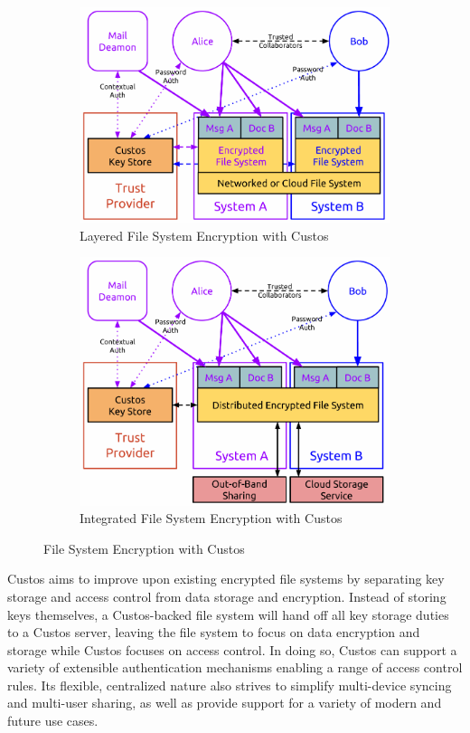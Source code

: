 \begin{figure}[!tb]
  \vspace{5ex}
  \begin{center}
    \begin{subfigure}{\textwidth}
      \begin{center}
        \includegraphics[width=.5\textwidth]
                        {./figs/pdf/FS-Custos-Layered.pdf}
        \caption{Layered File System Encryption with Custos}
        \label{fig:FS-custos-layered}
      \end{center}
    \end{subfigure}
    \begin{subfigure}{\textwidth}
      \begin{center}
        \includegraphics[width=.5\textwidth]
                        {./figs/pdf/FS-Custos-Integrated.pdf}
        \caption{Integrated File System Encryption with Custos}
        \label{fig:FS-custos-integrated}
      \end{center}
    \end{subfigure}
  \end{center}
  \caption{File System Encryption with Custos}
  \label{fig:FS-custos}
\end{figure}

Custos aims to improve upon existing encrypted file systems by
separating key storage and access control from data storage and
encryption. Instead of storing keys themselves, a Custos-backed file
system will hand off all key storage duties to a Custos server,
leaving the file system to focus on data encryption and storage while
Custos focuses on access control. In doing so, Custos can support a
variety of extensible authentication mechanisms enabling a range of
access control rules. Its flexible, centralized nature also strives to
simplify multi-device syncing and multi-user sharing, as well as
provide support for a variety of modern and future use cases.

